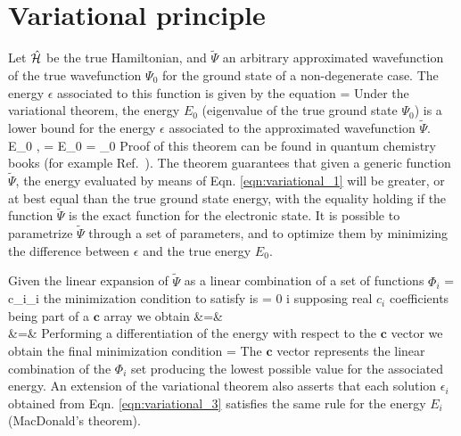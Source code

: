 \section{Variational principle}
\label{sec:variational}

Let $\hat{\mathcal{H}}$ be the true Hamiltonian, and $\tilde{\Psi}$ an arbitrary
approximated wavefunction of the true wavefunction $\Psi_0$ for the ground
state of a non-degenerate case. The energy $\epsilon$ associated to this
function is given by the equation
\beq
\label{eqn:variational_1}
\epsilon = \frac{\braket{\tilde{\Psi}}{\ham}{\tilde{\Psi}}}{\integral{\tilde{\Psi}}{\tilde{\Psi}}}
\eeq
Under the variational theorem, the energy $E_0$ (eigenvalue of the true ground
state $\Psi_0$) is a lower bound for the energy $\epsilon$ associated to the
approximated wavefunction $\tilde{\Psi}$.
\beq
\epsilon \ge E_0 \quad \forall \tilde{\Psi} \quad \mbox{,} \quad \epsilon = E_0 \Leftrightarrow
\tilde{\Psi} = \Psi_{0}
\eeq
Proof of this theorem can be found in quantum chemistry books (for example
Ref.~). The theorem guarantees that given
a generic function $\tilde{\Psi}$, the energy evaluated by means of
Eqn. \ref{eqn:variational_1} will be greater, or at best
equal than the true ground state energy, with the equality holding if the function $\tilde{\Psi}$
is the exact function for the electronic state. It is possible to
parametrize $\tilde{\Psi}$ through a set of parameters, and to optimize them
by minimizing the difference between $\epsilon$ and the true energy $E_0$.

Given the linear expansion of $\tilde{\Psi}$ as a linear combination
of a set of functions $\Phi_i$
\beq
\tilde{\Psi} = c_i\Phi_i
\eeq
the minimization condition to satisfy is
\beq
{} = 0 \quad \forall i
\eeq
supposing real $c_i$ coefficients being part of a $\mathbf{c}$ array we
obtain
\beqa
\epsilon &=&  \nonumber \\
&=& 
\eeqa
Performing a differentiation of the energy with respect to the $\mathbf{c}$
vector we obtain the final minimization condition
\beq
\label{eqn:variational_3}
 = \epsilon {} 
\eeq
The $\mathbf{c}$ vector represents the linear combination of the $\Phi_i$
set producing the lowest possible value for the associated energy. An
extension of the variational theorem also asserts that each
solution $\epsilon_i$ obtained from Eqn. \ref{eqn:variational_3} satisfies the
same rule for the energy $E_i$ (MacDonald's theorem). 
